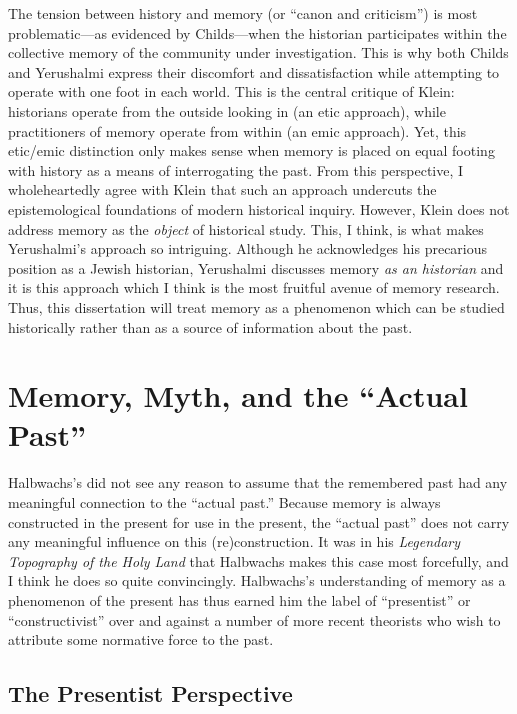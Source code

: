 The tension between history and memory (or ``canon and criticism'') is
most problematic---as evidenced by Childs---when the historian
participates within the collective memory of the community under
investigation. This is why both Childs and Yerushalmi express their
discomfort and dissatisfaction while attempting to operate with one foot
in each world. This is the central critique of Klein: historians operate
from the outside looking in (an etic approach), while practitioners of
memory operate from within (an emic approach). Yet, this etic/emic
distinction only makes sense when memory is placed on equal footing with
history as a means of interrogating the past. From this perspective, I
wholeheartedly agree with Klein that such an approach undercuts the
epistemological foundations of modern historical inquiry. However, Klein
does not address memory as the \emph{object} of historical study. This,
I think, is what makes Yerushalmi's approach so intriguing. Although he
acknowledges his precarious position as a Jewish historian, Yerushalmi
discusses memory \emph{as an historian} and it is this approach which I
think is the most fruitful avenue of memory research. Thus, this
dissertation will treat memory as a phenomenon which can be studied
historically rather than as a source of information about the past.

\hypertarget{memory-myth-and-the-actual-past}{%
\section{Memory, Myth, and the ``Actual
Past''}\label{memory-myth-and-the-actual-past}}

Halbwachs's did not see any reason to assume that the remembered past
had any meaningful connection to the ``actual past.'' Because memory is
always constructed in the present for use in the present, the ``actual
past'' does not carry any meaningful influence on this (re)construction.
It was in his \emph{Legendary Topography of the Holy Land} that
Halbwachs makes this case most forcefully, and I think he does so quite
convincingly. Halbwachs's understanding of memory as a phenomenon of the
present has thus earned him the label of ``presentist'' or
``constructivist'' over and against a number of more recent theorists
who wish to attribute some normative force to the
past.\autocite[27--30]{coser_halbwachs1992}

\hypertarget{the-presentist-perspective}{%
\subsection{The Presentist
Perspective}\label{the-presentist-perspective}}

